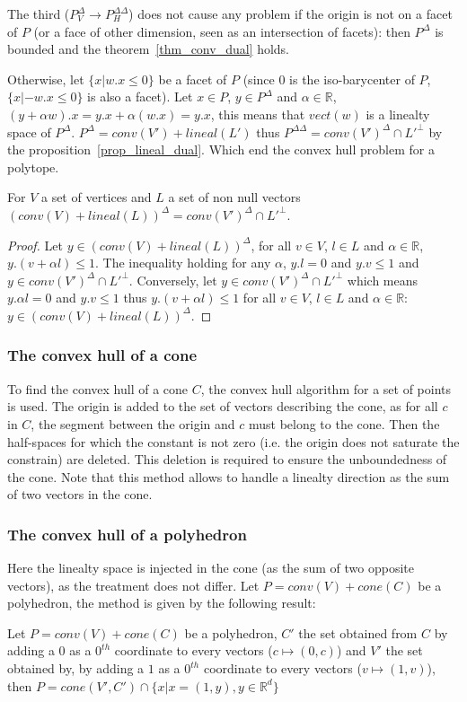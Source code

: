 The third ($P_V^\Delta \rightarrow P_H^{\Delta\Delta}$) does not cause any problem if the origin is not on a facet of $P$ (or a face of other dimension, seen as an intersection of facets): then $P^\Delta$ is bounded and the theorem~\ref{thm_conv_dual} holds.

Otherwise, let $\{x|w.x \leq 0\}$ be a facet of $P$ (since $0$ is the iso-barycenter of $P$, $\{x| -w.x \leq 0\}$ is also a facet). Let $x\in P$, $y\in P^\Delta$ and $\alpha\in\mathbb{R}$, $(y+\alpha w).x=y.x+\alpha(w.x)=y.x$, this means that $vect(w)$ is a linealty space of $P^\Delta$. $P^\Delta=conv(V')+lineal(L')$ thus $P^{\Delta\Delta}=conv(V')^\Delta \cap L'^\bot$ by the proposition~\ref{prop_lineal_dual}. Which end the convex hull problem for a polytope.

\begin{proposition}
For $V$ a set of vertices and $L$ a set of non null vectors $(conv(V)+lineal(L))^\Delta = conv(V')^\Delta \cap L'^\bot$. 
\label{prop_lineal_dual}
\end{proposition}
\begin{proof}
Let $y\in (conv(V)+lineal(L))^\Delta$, for all $v\in V$, $l \in L$ and $\alpha\in\mathbb{R}$, $y.(v+\alpha l)\leq 1$. The inequality holding for any $\alpha$,  $y.l=0$ and $y.v\leq 1$ and $y\in conv(V')^\Delta \cap L'^\bot$. Conversely, let $y \in conv(V')^\Delta \cap L'^\bot$ which means $y.\alpha l=0$ and $y.v\leq 1$ thus $y.(v+\alpha l)\leq 1$ for all $v\in V$, $l \in L$ and $\alpha\in\mathbb{R}$: $y\in (conv(V)+lineal(L))^\Delta$.
\end{proof}

\subsubsection{The convex hull of a cone}\label{ss_conehull}
To find the convex hull of a cone $C$, the convex hull algorithm for a set of points is used.
The origin is added to the set of vectors describing the cone, as for all $c$ in $C$, the segment between the origin and $c$ must belong to the cone. Then the half-spaces for which  the constant is not zero (i.e. the origin does not saturate the constrain) are deleted. This deletion is required to ensure the unboundedness of the cone. Note that this method allows to handle a linealty direction as the sum of two vectors in the cone.

\subsubsection{The convex hull of a polyhedron}
Here the linealty space is injected in the cone (as the sum of two opposite vectors), as the treatment does not differ. Let $P=conv(V) + cone(C)$ be a polyhedron, the method is given by the following result:
\begin{proposition}
Let $P=conv(V) + cone(C)$ be a polyhedron, $C'$ the set obtained from $C$ by adding a $0$ as a $0^{th}$ coordinate to every vectors ($c \mapsto (0,c)$) and $V'$ the set obtained by, by adding a $1$ as a $0^{th}$ coordinate to every vectors ($v \mapsto (1,v)$), then $P=cone(V',C')\cap \{ x| x= (1,y), y\in \mathbb{R}^d \}$
\end{proposition}

